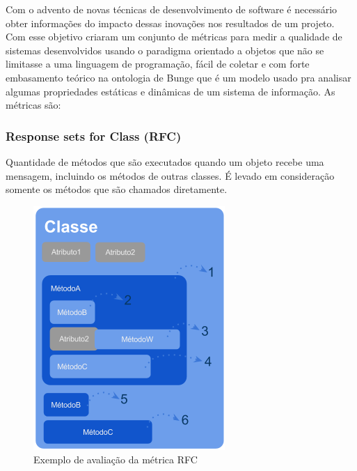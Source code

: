 \documentclass[conference]{IEEEtran}
\begin{document}



Com o advento de novas técnicas de desenvolvimento de software é necessário
obter informações do impacto dessas inovações nos resultados de um projeto. Com
esse objetivo \cite{cksuite} criaram um conjunto de métricas para
medir a qualidade de sistemas desenvolvidos usando o paradigma orientado a
objetos que não se limitasse a uma linguagem de programação, fácil de coletar e
com forte embasamento teórico na ontologia de Bunge que é um modelo usado pra
analisar algumas propriedades estáticas e dinâmicas de um sistema de
informação\cite{WandWeber}. As métricas são:






\subsubsection{\textbf{Response sets for Class (RFC)}} Quantidade de métodos
que são executados quando um objeto recebe uma mensagem, incluindo os métodos de outras classes. É
levado em consideração somente os métodos que são chamados diretamente.

\begin{figure}[htb]
	\begin{center}
		\includegraphics[scale=0.6]{img/pic_rfc.png}
	\end{center}
	\caption{\label{fig:pic_rfc}Exemplo de avaliação da métrica RFC}
\end{figure}
\end{document}
